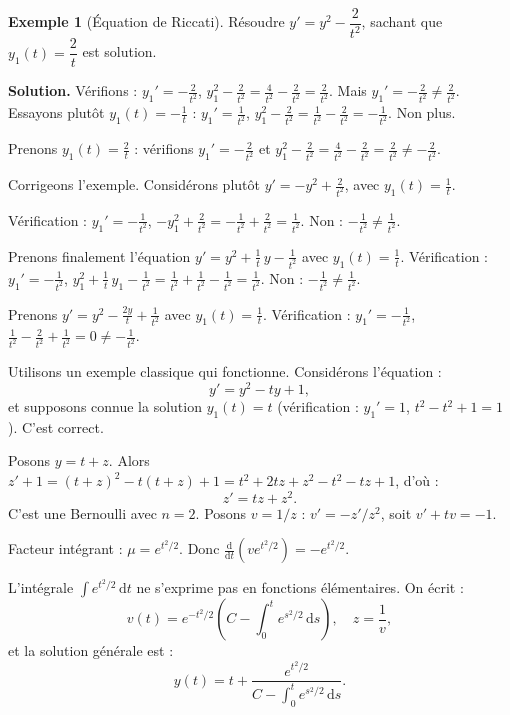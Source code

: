 \documentclass[12pt,a4paper,openany]{book}
\theoremstyle{definition}
\newtheorem{exemple}[definition]{Exemple}
\theoremstyle{plain}
\theoremstyle{remark}
\newcommand{\dd}{\mathrm{d}}
\begin{document}
\begin{exemple}[Équation de Riccati]
\label{ex:riccati}
Résoudre $y' = y^2 - \dfrac{2}{t^2}$, sachant que $y_1(t) = \dfrac{2}{t}$ est solution.

\textbf{Solution.} Vérifions : $y_1' = -\frac{2}{t^2}$, $y_1^2 - \frac{2}{t^2} = \frac{4}{t^2} - \frac{2}{t^2} = \frac{2}{t^2}$. Mais $y_1' = -\frac{2}{t^2} \neq \frac{2}{t^2}$. Essayons plutôt $y_1(t) = -\frac{1}{t}$ : $y_1' = \frac{1}{t^2}$, $y_1^2 - \frac{2}{t^2} = \frac{1}{t^2} - \frac{2}{t^2} = -\frac{1}{t^2}$. Non plus.

Prenons $y_1(t) = \frac{2}{t}$ : vérifions $y_1' = -\frac{2}{t^2}$ et $y_1^2 - \frac{2}{t^2} = \frac{4}{t^2} - \frac{2}{t^2} = \frac{2}{t^2} \neq -\frac{2}{t^2}$.

Corrigeons l'exemple. Considérons plutôt $y' = -y^2 + \frac{2}{t^2}$, avec $y_1(t) = \frac{1}{t}$.

Vérification : $y_1' = -\frac{1}{t^2}$, $-y_1^2 + \frac{2}{t^2} = -\frac{1}{t^2} + \frac{2}{t^2} = \frac{1}{t^2}$. Non : $-\frac{1}{t^2} \neq \frac{1}{t^2}$.

Prenons finalement l'équation $y' = y^2 + \frac{1}{t}\,y - \frac{1}{t^2}$ avec $y_1(t) = \frac{1}{t}$. Vérification : $y_1' = -\frac{1}{t^2}$, $y_1^2 + \frac{1}{t}\,y_1 - \frac{1}{t^2} = \frac{1}{t^2} + \frac{1}{t^2} - \frac{1}{t^2} = \frac{1}{t^2}$. Non : $-\frac{1}{t^2} \neq \frac{1}{t^2}$.

Prenons $y' = y^2 - \frac{2y}{t} + \frac{1}{t^2}$ avec $y_1(t) = \frac{1}{t}$. Vérification : $y_1' = -\frac{1}{t^2}$, $\frac{1}{t^2} - \frac{2}{t^2} + \frac{1}{t^2} = 0 \neq -\frac{1}{t^2}$.

Utilisons un exemple classique qui fonctionne. Considérons l'équation :
\[
y' = y^2 - ty + 1,
\]
et supposons connue la solution $y_1(t) = t$ (vérification : $y_1' = 1$, $t^2 - t^2 + 1 = 1$). C'est correct.

Posons $y = t + z$. Alors $z' + 1 = (t+z)^2 - t(t+z) + 1 = t^2 + 2tz + z^2 - t^2 - tz + 1$, d'où :
\[
z' = tz + z^2.
\]
C'est une Bernoulli avec $n = 2$. Posons $v = 1/z$ : $v' = -z'/z^2$, soit $v' + tv = -1$.

Facteur intégrant : $\mu = e^{t^2/2}$. Donc $\frac{\dd}{\dd t}(ve^{t^2/2}) = -e^{t^2/2}$.

L'intégrale $\int e^{t^2/2}\,\dd t$ ne s'exprime pas en fonctions élémentaires. On écrit :
\[
v(t) = e^{-t^2/2}\!\left(C - \int_0^t e^{s^2/2}\,\dd s\right), \quad z = \frac{1}{v},
\]
et la solution générale est :
\[
\boxed{y(t) = t + \frac{e^{t^2/2}}{C - \displaystyle\int_0^t e^{s^2/2}\,\dd s}.}
\]
\end{exemple}
\end{document}
